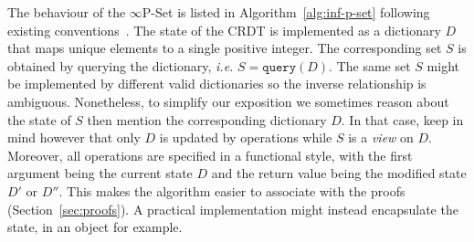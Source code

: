 \documentclass[11pt, oneside]{article}   	%
\begin{document}
The behaviour of the $\infty$P-Set is listed in Algorithm~\ref{alg:inf-p-set} following existing conventions~\cite{shapiro:inria-00555588}.  The state of the CRDT is implemented as a dictionary $D$ that 
maps unique elements to a single positive integer. The corresponding set $S$ is obtained by querying the dictionary, \textit{i.e.} $S=\texttt{query}(D)$. The same set $S$ might be implemented by different valid dictionaries so the inverse relationship is ambiguous. Nonetheless, to simplify our exposition we sometimes reason about the state of $S$ then mention the corresponding dictionary $D$. In that case, keep in mind however that only $D$ is updated by operations while $S$ is a \textit{view} on $D$. Moreover, all operations are specified in a functional style, with the first argument being the current state $D$ and the return value being the modified state $D'$ or $D''$. This makes the algorithm easier to associate with the proofs (Section~\ref{sec:proofs}). A practical implementation might instead encapsulate the state, in an object for example.
\end{document}
